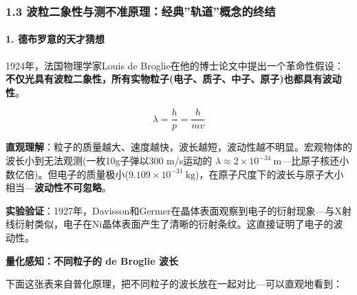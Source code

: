 \subsubsection{1.3 波粒二象性与测不准原理：经典''轨道''概念的终结}\label{ux6ce2ux7c92ux4e8cux8c61ux6027ux4e0eux6d4bux4e0dux51c6ux539fux7406ux7ecfux5178ux8f68ux9053ux6982ux5ff5ux7684ux7ec8ux7ed3}

\paragraph{1. 德布罗意的天才猜想}\label{ux5fb7ux5e03ux7f57ux610fux7684ux5929ux624dux731cux60f3}

1924年，法国物理学家Louis de Broglie在他的博士论文中提出一个革命性假设：\textbf{不仅光具有波粒二象性，所有实物粒子(电子、质子、中子、原子)也都具有波动性}。

\[\lambda = \frac{h}{p} = \frac{h}{mv}\]

\textbf{直观理解}：粒子的质量越大、速度越快，波长越短，波动性越不明显。宏观物体的波长小到无法观测(一枚10g子弹以300 m/s运动的 \(\lambda \approx 2\times 10^{-34}\ \mathrm{m}\)---比原子核还小数亿倍)。但电子的质量极小(\(9.109\times 10^{-31}\ \mathrm{kg}\))，在原子尺度下的波长与原子大小相当---\textbf{波动性不可忽略}。

\textbf{实验验证}：1927年，Davisson和Germer在晶体表面观察到电子的衍射现象---与X射线衍射类似，电子在Ni晶体表面产生了清晰的衍射条纹。这直接证明了电子的波动性。

\textbf{量化感知：不同粒子的 de Broglie 波长}

下面这张表来自普化原理，把不同粒子的波长放在一起对比---可以直观地看到：

